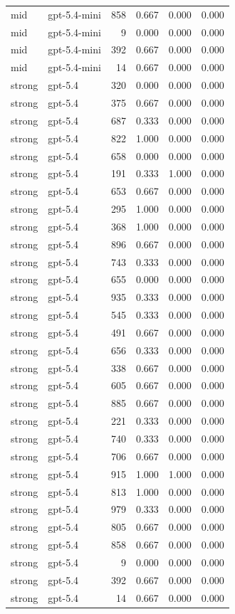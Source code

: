 \begin{tabular}{llrrrr}
mid & gpt-5.4-mini & 858 & 0.667 & 0.000 & 0.000 \\
mid & gpt-5.4-mini & 9 & 0.000 & 0.000 & 0.000 \\
mid & gpt-5.4-mini & 392 & 0.667 & 0.000 & 0.000 \\
mid & gpt-5.4-mini & 14 & 0.667 & 0.000 & 0.000 \\
strong & gpt-5.4 & 320 & 0.000 & 0.000 & 0.000 \\
strong & gpt-5.4 & 375 & 0.667 & 0.000 & 0.000 \\
strong & gpt-5.4 & 687 & 0.333 & 0.000 & 0.000 \\
strong & gpt-5.4 & 822 & 1.000 & 0.000 & 0.000 \\
strong & gpt-5.4 & 658 & 0.000 & 0.000 & 0.000 \\
strong & gpt-5.4 & 191 & 0.333 & 1.000 & 0.000 \\
strong & gpt-5.4 & 653 & 0.667 & 0.000 & 0.000 \\
strong & gpt-5.4 & 295 & 1.000 & 0.000 & 0.000 \\
strong & gpt-5.4 & 368 & 1.000 & 0.000 & 0.000 \\
strong & gpt-5.4 & 896 & 0.667 & 0.000 & 0.000 \\
strong & gpt-5.4 & 743 & 0.333 & 0.000 & 0.000 \\
strong & gpt-5.4 & 655 & 0.000 & 0.000 & 0.000 \\
strong & gpt-5.4 & 935 & 0.333 & 0.000 & 0.000 \\
strong & gpt-5.4 & 545 & 0.333 & 0.000 & 0.000 \\
strong & gpt-5.4 & 491 & 0.667 & 0.000 & 0.000 \\
strong & gpt-5.4 & 656 & 0.333 & 0.000 & 0.000 \\
strong & gpt-5.4 & 338 & 0.667 & 0.000 & 0.000 \\
strong & gpt-5.4 & 605 & 0.667 & 0.000 & 0.000 \\
strong & gpt-5.4 & 885 & 0.667 & 0.000 & 0.000 \\
strong & gpt-5.4 & 221 & 0.333 & 0.000 & 0.000 \\
strong & gpt-5.4 & 740 & 0.333 & 0.000 & 0.000 \\
strong & gpt-5.4 & 706 & 0.667 & 0.000 & 0.000 \\
strong & gpt-5.4 & 915 & 1.000 & 1.000 & 0.000 \\
strong & gpt-5.4 & 813 & 1.000 & 0.000 & 0.000 \\
strong & gpt-5.4 & 979 & 0.333 & 0.000 & 0.000 \\
strong & gpt-5.4 & 805 & 0.667 & 0.000 & 0.000 \\
strong & gpt-5.4 & 858 & 0.667 & 0.000 & 0.000 \\
strong & gpt-5.4 & 9 & 0.000 & 0.000 & 0.000 \\
strong & gpt-5.4 & 392 & 0.667 & 0.000 & 0.000 \\
strong & gpt-5.4 & 14 & 0.667 & 0.000 & 0.000 \\
\bottomrule
\end{tabular}
